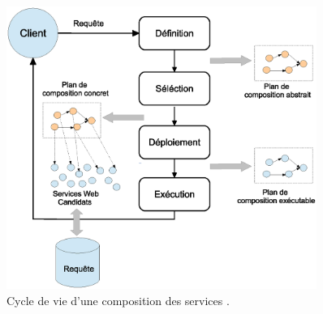 \begin{figure}[h]
    \centering
    \includegraphics[width=0.9\textwidth]{figs/composition-life-cycle.eps}
    \caption{Cycle de vie d'une composition des services
      \cite{sheng2014web}.}
    \label{fig:composition-life-cycle.eps}
\end{figure}

